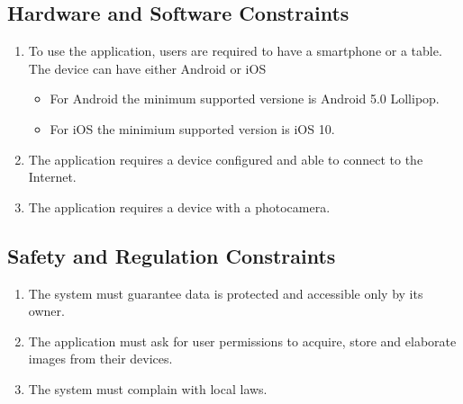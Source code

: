 \subsection{Hardware  and Software Constraints}
\begin{enumerate}
    \item To use the application, users are required to have a smartphone or a table. The device can have either Android or iOS 
        \begin{itemize}
            \item For Android the minimum supported versione is Android 5.0 Lollipop.
            \item For iOS the minimium supported version is iOS 10.
        \end{itemize}
    \item The application requires a device configured and able to connect to the Internet.
    \item The application requires a device with a photocamera.
\end{enumerate}

\subsection{Safety and Regulation Constraints}
\begin{enumerate}
    \item The system must guarantee data is protected and accessible only by its owner.
    \item The application must ask for user permissions to acquire, store and elaborate images from their devices.
    \item The system must complain with local laws.  
\end{enumerate}


